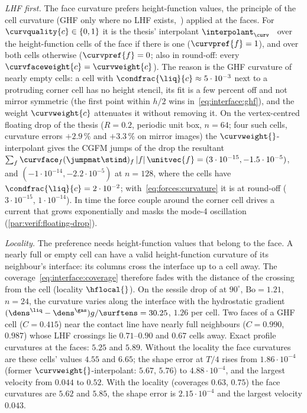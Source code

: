 \emph{LHF first.} The face curvature prefers height-function values, the
principle of the cell curvature (GHF only where no LHF
exists,~) applied at the faces. For
$\curvquality{c}\in\{0,1\}$ it is the thesis' interpolant
$\interpolant_{\curv}$~ over the
height-function cells of the face if there is one ($\curvpref{f}=1$), and over
both cells otherwise ($\curvpref{f}=0$; also in round-off: every
$\curvfaceweight{c}=\curvweight{c}$). The reason is the
GHF curvature of nearly empty cells: a cell with
$\condfrac{\liq}{c}\approx5\cdot10^{-3}$ next to a protruding corner cell has
no height stencil, its fit is a few percent off and not mirror symmetric
(the first point within $h/2$ wins in~\cref{eq:interface:ghf}), and the weight
$\curvweight{c}$ attenuates it without removing it. On the vertex-centred
floating drop of the thesis ($R=0.2$, periodic unit box, $n=64$; four such
cells, curvature errors $+2.9\,\%$ and $+3.3\,\%$ on mirror images) the
$\curvweight{}$-interpolant gives the CGFM jumps of the drop the resultant
$\sum_f\curvface_f(\jumpmat\stind)_f\abs{f}\unitvec{f}=(3\cdot10^{-15},-1.5\cdot10^{-5})$,
and $(-1\cdot10^{-14},-2.2\cdot10^{-5})$ at $n=128$, where the cells have
$\condfrac{\liq}{c}=2\cdot10^{-2}$; with~\cref{eq:forces:curvature} it is at
round-off ($3\cdot10^{-15}$, $1\cdot10^{-14}$). In time the force couple
around the corner cell drives a current that grows exponentially and masks the
mode-4 oscillation (\cref{par:verif:floating-drop}).

\emph{Locality.} The preference needs height-function values that belong to
the face. A nearly full or empty cell can have a valid height-function
curvature of its neighbour's interface: its columns cross the interface up to a
cell away. The coverage~\cref{eq:interface:coverage} therefore fades with the
distance of the crossing from the cell (locality $\hflocal{}$). On the sessile
drop of 
at $90^\circ$, $\mathrm{Bo}=1.21$, $n=24$, the
curvature varies along the interface with the hydrostatic gradient
$(\dens^{\liq}-\dens^{\gas})g/\surftens=30.25$, $1.26$ per cell. Two faces of a
GHF cell ($C=0.415$) near the contact line have nearly full neighbours
($C=0.990$, $0.987$) whose LHF crossings lie $0.71$--$0.90$ and $0.67$ cells
away. Exact profile curvatures at the faces: $5.25$ and $5.89$. Without the
locality the face curvatures are these cells' values $4.55$ and $6.65$; the
shape error at $T/4$ rises from $1.86\cdot10^{-4}$ (former
$\curvweight{}$-interpolant: $5.67$, $5.76$) to $4.88\cdot10^{-4}$, and the
largest velocity from $0.044$ to $0.52$. With the locality (coverages $0.63$,
$0.75$) the face curvatures are $5.62$ and $5.85$, the shape error is
$2.15\cdot10^{-4}$ and the largest velocity $0.043$.

